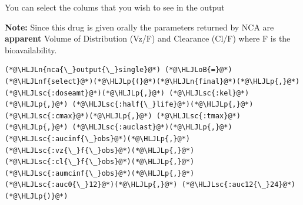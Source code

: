 \documentclass[12pt,a4paper]{article}
\newcommand{\HLJLn}[1]{#1}
\newcommand{\HLJLnf}[1]{\textcolor[RGB]{66,102,213}{#1}}
\newcommand{\HLJLsc}[1]{\textcolor[RGB]{201,61,57}{#1}}
\newcommand{\HLJLoB}[1]{\textcolor[RGB]{102,102,102}{\textbf{#1}}}
\newcommand{\HLJLp}[1]{#1}
\begin{document}
You can select the colums that you wish to see in the output

\textbf{Note:} Since this drug is given orally the parameters returned by NCA are \textbf{apparent} Volume of Distribution (Vz/F) and Clearance (Cl/F) where F is the bioavailability.


\begin{lstlisting}
(*@\HLJLn{nca{\_}output{\_}single}@*) (*@\HLJLoB{=}@*) (*@\HLJLnf{select}@*)(*@\HLJLp{(}@*)(*@\HLJLn{final}@*)(*@\HLJLp{,}@*) (*@\HLJLsc{:doseamt}@*)(*@\HLJLp{,}@*) (*@\HLJLsc{:kel}@*)(*@\HLJLp{,}@*) (*@\HLJLsc{:half{\_}life}@*)(*@\HLJLp{,}@*) (*@\HLJLsc{:cmax}@*)(*@\HLJLp{,}@*) (*@\HLJLsc{:tmax}@*)(*@\HLJLp{,}@*) (*@\HLJLsc{:auclast}@*)(*@\HLJLp{,}@*) (*@\HLJLsc{:aucinf{\_}obs}@*)(*@\HLJLp{,}@*) (*@\HLJLsc{:vz{\_}f{\_}obs}@*)(*@\HLJLp{,}@*) (*@\HLJLsc{:cl{\_}f{\_}obs}@*)(*@\HLJLp{,}@*) (*@\HLJLsc{:aumcinf{\_}obs}@*)(*@\HLJLp{,}@*) (*@\HLJLsc{:auc0{\_}12}@*)(*@\HLJLp{,}@*) (*@\HLJLsc{:auc12{\_}24}@*)(*@\HLJLp{)}@*)
\end{lstlisting}
\end{document}
